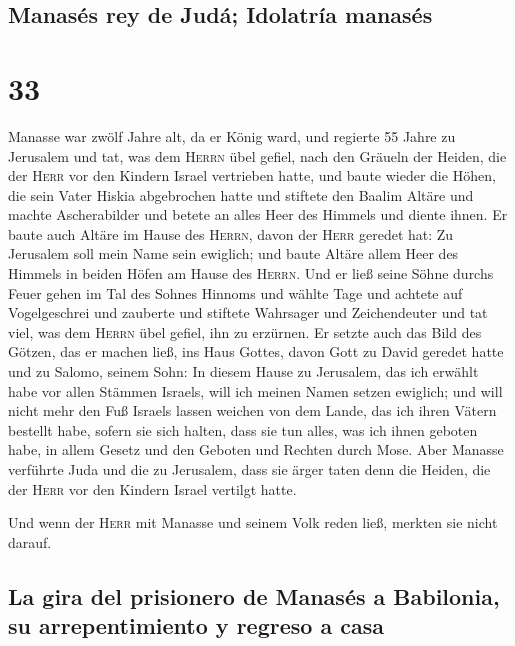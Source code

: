 \hypertarget{manasuxe9s-rey-de-juduxe1-idolatruxeda-manasuxe9s}{%
\subsection{Manasés rey de Judá; Idolatría
manasés}\label{manasuxe9s-rey-de-juduxe1-idolatruxeda-manasuxe9s}}

\hypertarget{section-32}{%
\section{33}\label{section-32}}

 Manasse war zwölf Jahre alt, da er König ward, und
regierte 55 Jahre zu Jerusalem  und tat, was dem
\textsc{Herrn} übel gefiel, nach den Gräueln der Heiden, die der
\textsc{Herr} vor den Kindern Israel vertrieben hatte, 
und baute wieder die Höhen, die sein Vater Hiskia abgebrochen hatte und
stiftete den Baalim Altäre und machte Ascherabilder und betete an alles
Heer des Himmels und diente ihnen.  Er baute auch Altäre
im Hause des \textsc{Herrn}, davon der \textsc{Herr} geredet hat: Zu
Jerusalem soll mein Name sein ewiglich;  und baute Altäre
allem Heer des Himmels in beiden Höfen am Hause des \textsc{Herrn}.
 Und er ließ seine Söhne durchs Feuer gehen im Tal des
Sohnes Hinnoms und wählte Tage und achtete auf Vogelgeschrei und
zauberte und stiftete Wahrsager und Zeichendeuter und tat viel, was dem
\textsc{Herrn} übel gefiel, ihn zu erzürnen.  Er setzte
auch das Bild des Götzen, das er machen ließ, ins Haus Gottes, davon
Gott zu David geredet hatte und zu Salomo, seinem Sohn: In diesem Hause
zu Jerusalem, das ich erwählt habe vor allen Stämmen Israels, will ich
meinen Namen setzen ewiglich;  und will nicht mehr den Fuß
Israels lassen weichen von dem Lande, das ich ihren Vätern bestellt
habe, sofern sie sich halten, dass sie tun alles, was ich ihnen geboten
habe, in allem Gesetz und den Geboten und Rechten durch Mose.
 Aber Manasse verführte Juda und die zu Jerusalem, dass
sie ärger taten denn die Heiden, die der \textsc{Herr} vor den Kindern
Israel vertilgt hatte.

 Und wenn der \textsc{Herr} mit Manasse und seinem Volk
reden ließ, merkten sie nicht darauf.

\hypertarget{la-gira-del-prisionero-de-manasuxe9s-a-babilonia-su-arrepentimiento-y-regreso-a-casa}{%
\subsection{La gira del prisionero de Manasés a Babilonia, su
arrepentimiento y regreso a
casa}\label{la-gira-del-prisionero-de-manasuxe9s-a-babilonia-su-arrepentimiento-y-regreso-a-casa}}

